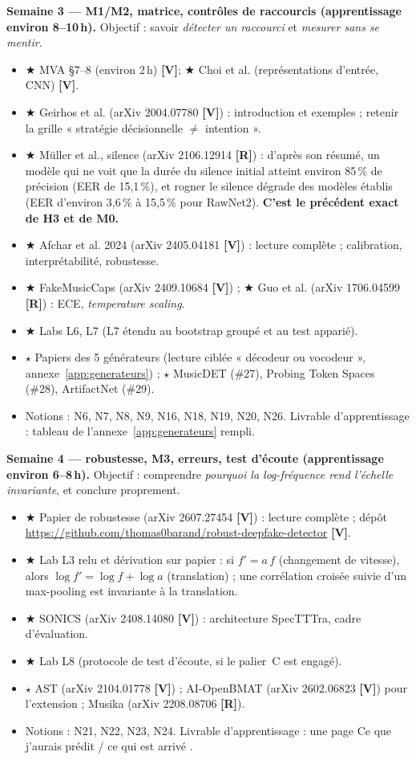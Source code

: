 \documentclass[11pt,a4paper]{article}
\newcommand{\sV}{\textbf{[V]}}
\newcommand{\sR}{\textbf{[R]}}
\newcommand{\smin}{$\bigstar$}   %
\newcommand{\sapp}{$\star$}      %
\begin{document}
\textbf{Semaine 3 --- M1/M2, matrice, contrôles de raccourcis (apprentissage environ 8--10\,h).} Objectif : savoir \emph{détecter un raccourci} et \emph{mesurer sans se mentir}.
\begin{itemize}
  \item \smin{} MVA \S7--8 (environ 2\,h) \sV ; \smin{} Choi et al. (représentations d'entrée, CNN) \sV.
  \item \smin{} Geirhos et al. (arXiv 2004.07780 \sV) : introduction et exemples ; retenir la grille « stratégie décisionnelle $\neq$ intention ».
  \item \smin{} Müller et al., silence (arXiv 2106.12914 \sR) : d'après son résumé, un modèle qui ne voit que la durée du silence initial atteint environ 85\,\% de précision (EER de 15,1\,\%), et rogner le silence dégrade des modèles établis (EER d'environ 3,6\,\% à 15,5\,\% pour RawNet2). \textbf{C'est le précédent exact de H3 et de M0.}
  \item \smin{} Afchar et al. 2024 (arXiv 2405.04181 \sV) : lecture complète ; calibration, interprétabilité, robustesse.
  \item \smin{} FakeMusicCaps (arXiv 2409.10684 \sV) ; \smin{} Guo et al. (arXiv 1706.04599 \sR) : ECE, \emph{temperature scaling}.
  \item \smin{} Labs L6, L7 (L7 étendu au bootstrap groupé et au test apparié).
  \item \sapp{} Papiers des 5 générateurs (lecture ciblée « décodeur ou vocodeur », annexe~\ref{app:generateurs}) ; \sapp{} MusicDET (\#27), Probing Token Spaces (\#28), ArtifactNet (\#29).
  \item Notions : N6, N7, N8, N9, N16, N18, N19, N20, N26. Livrable d'apprentissage : tableau de l'annexe~\ref{app:generateurs} rempli.
\end{itemize}

\textbf{Semaine 4 --- robustesse, M3, erreurs, test d'écoute (apprentissage environ 6--8\,h).} Objectif : comprendre \emph{pourquoi la log-fréquence rend l'échelle invariante}, et conclure proprement.
\begin{itemize}
  \item \smin{} Papier de robustesse (arXiv 2607.27454 \sV) : lecture complète ; dépôt \url{https://github.com/thomas0barand/robust-deepfake-detector} \sV.
  \item \smin{} Lab L3 relu et dérivation sur papier : si $f' = a\,f$ (changement de vitesse), alors $\log f' = \log f + \log a$ (translation) ; une corrélation croisée suivie d'un max-pooling est invariante à la translation.
  \item \smin{} SONICS (arXiv 2408.14080 \sV) : architecture SpecTTTra, cadre d'évaluation.
  \item \smin{} Lab L8 (protocole de test d'écoute, si le palier~C est engagé).
  \item \sapp{} AST (arXiv 2104.01778 \sV) ; AI-OpenBMAT (arXiv 2602.06823 \sV) pour l'extension ; Musika (arXiv 2208.08706 \sR).
  \item Notions : N21, N22, N23, N24. Livrable d'apprentissage : une page \og Ce que j'aurais prédit / ce qui est arrivé \fg.
\end{itemize}
\end{document}
